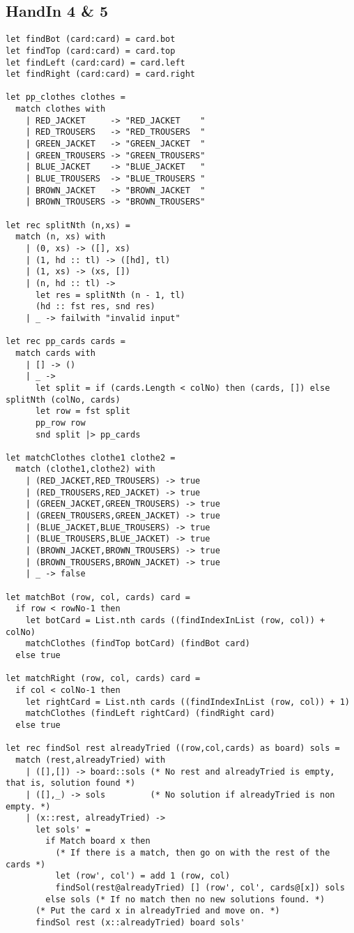 \subsection{HandIn 4 \& 5}
\label{Appendix_FSharp_Ulrik_4and5}
\begin{lstlisting}
let findBot (card:card) = card.bot
let findTop (card:card) = card.top
let findLeft (card:card) = card.left
let findRight (card:card) = card.right

let pp_clothes clothes =
  match clothes with
    | RED_JACKET     -> "RED_JACKET    "
    | RED_TROUSERS   -> "RED_TROUSERS  "
    | GREEN_JACKET   -> "GREEN_JACKET  "
    | GREEN_TROUSERS -> "GREEN_TROUSERS"
    | BLUE_JACKET    -> "BLUE_JACKET   "
    | BLUE_TROUSERS  -> "BLUE_TROUSERS "
    | BROWN_JACKET   -> "BROWN_JACKET  "
    | BROWN_TROUSERS -> "BROWN_TROUSERS"

let rec splitNth (n,xs) =
  match (n, xs) with
    | (0, xs) -> ([], xs)
    | (1, hd :: tl) -> ([hd], tl)
    | (1, xs) -> (xs, [])
    | (n, hd :: tl) ->
      let res = splitNth (n - 1, tl)
      (hd :: fst res, snd res)
    | _ -> failwith "invalid input"

let rec pp_cards cards = 
  match cards with
    | [] -> ()
    | _ ->
      let split = if (cards.Length < colNo) then (cards, []) else splitNth (colNo, cards)
      let row = fst split
      pp_row row
      snd split |> pp_cards

let matchClothes clothe1 clothe2 =
  match (clothe1,clothe2) with
    | (RED_JACKET,RED_TROUSERS) -> true
    | (RED_TROUSERS,RED_JACKET) -> true
    | (GREEN_JACKET,GREEN_TROUSERS) -> true
    | (GREEN_TROUSERS,GREEN_JACKET) -> true
    | (BLUE_JACKET,BLUE_TROUSERS) -> true
    | (BLUE_TROUSERS,BLUE_JACKET) -> true
    | (BROWN_JACKET,BROWN_TROUSERS) -> true
    | (BROWN_TROUSERS,BROWN_JACKET) -> true
    | _ -> false

let matchBot (row, col, cards) card = 
  if row < rowNo-1 then
    let botCard = List.nth cards ((findIndexInList (row, col)) + colNo)
    matchClothes (findTop botCard) (findBot card)
  else true

let matchRight (row, col, cards) card =
  if col < colNo-1 then
    let rightCard = List.nth cards ((findIndexInList (row, col)) + 1)
    matchClothes (findLeft rightCard) (findRight card)
  else true

let rec findSol rest alreadyTried ((row,col,cards) as board) sols =
  match (rest,alreadyTried) with
    | ([],[]) -> board::sols (* No rest and alreadyTried is empty, that is, solution found *)
    | ([],_) -> sols         (* No solution if alreadyTried is non empty. *)
    | (x::rest, alreadyTried) ->
      let sols' = 
        if Match board x then
          (* If there is a match, then go on with the rest of the cards *)
          let (row', col') = add 1 (row, col)
          findSol(rest@alreadyTried) [] (row', col', cards@[x]) sols
        else sols (* If no match then no new solutions found. *)
      (* Put the card x in alreadyTried and move on. *)
      findSol rest (x::alreadyTried) board sols'
\end{lstlisting}